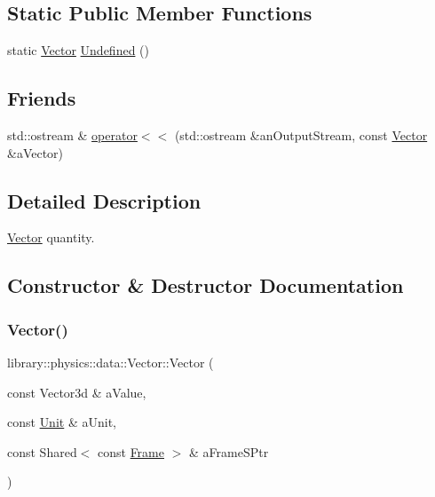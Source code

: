 \subsection*{Static Public Member Functions}
\begin{DoxyCompactItemize}
\item 
static \hyperlink{classlibrary_1_1physics_1_1data_1_1_vector}{Vector} \hyperlink{classlibrary_1_1physics_1_1data_1_1_vector_a75b4dda1e2ddffc9ee76b2c5e9ff2aaf}{Undefined} ()
\end{DoxyCompactItemize}
\subsection*{Friends}
\begin{DoxyCompactItemize}
\item 
std\+::ostream \& \hyperlink{classlibrary_1_1physics_1_1data_1_1_vector_a2f1253dbad20965d2209456421eabf71}{operator$<$$<$} (std\+::ostream \&an\+Output\+Stream, const \hyperlink{classlibrary_1_1physics_1_1data_1_1_vector}{Vector} \&a\+Vector)
\end{DoxyCompactItemize}


\subsection{Detailed Description}
\hyperlink{classlibrary_1_1physics_1_1data_1_1_vector}{Vector} quantity. 

\subsection{Constructor \& Destructor Documentation}
\mbox{\label{classlibrary_1_1physics_1_1data_1_1_vector_a1e94a0820c3d865d5c30214ad180da4b}} 
\subsubsection{\texorpdfstring{Vector()}{Vector()}}
{\footnotesize\ttfamily library\+::physics\+::data\+::\+Vector\+::\+Vector (\begin{DoxyParamCaption}\item[{const Vector3d \&}]{a\+Value,  }\item[{const \hyperlink{classlibrary_1_1physics_1_1_unit}{Unit} \&}]{a\+Unit,  }\item[{const Shared$<$ const \hyperlink{classlibrary_1_1physics_1_1coord_1_1_frame}{Frame} $>$ \&}]{a\+Frame\+S\+Ptr }\end{DoxyParamCaption})}



